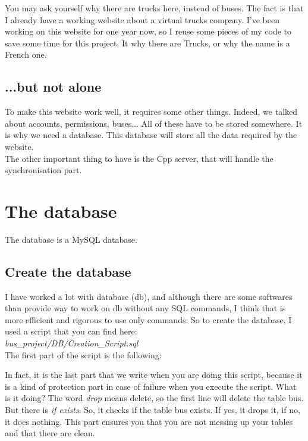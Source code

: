 \documentclass[12pt,a4paper,openany]{book}
\begin{document}
\begin{remarque}
	You may ask yourself why there are trucks here, instead of buses. The fact is that I already have a working website about a virtual trucks company. I've been working on this website for one year now, so I reuse some pieces of  my code to save some time for this project. It why there are Trucks, or why the name is a French one.
\end{remarque}

\subsection{...but not alone}
To make this website work well, it requires some other things. Indeed, we talked about accounts, permissions, buses... All of these have to be stored somewhere. It is why we need a database. This database will store all the data required by the website.\\
The other important thing to have is the Cpp server, that will handle the synchronisation part.

\section{The database}
The database is a MySQL database.
\subsection{Create the database}
I have worked a lot with database (db), and although there are some softwares than provide way to work on db without any SQL commands, I think that is more efficient and rigorous to use only commands. So to create the database, I used a script that you can find here:\\
\emph{bus\_project/DB/Creation\_Script.sql}\\

The first part of the script is the following:

\bigskip
In fact, it is the last part that we write when you are doing this script, because it is a kind of protection part in case of failure when you execute the script. What is it doing? The word \emph{drop} means delete, so the first line will delete the table bus. But there is \emph{if exists}. So, it checks if the table bus exists. If yes, it drops it, if no, it does nothing. This part ensures you that you are not messing up your tables and that there are clean.\\
\end{document}
